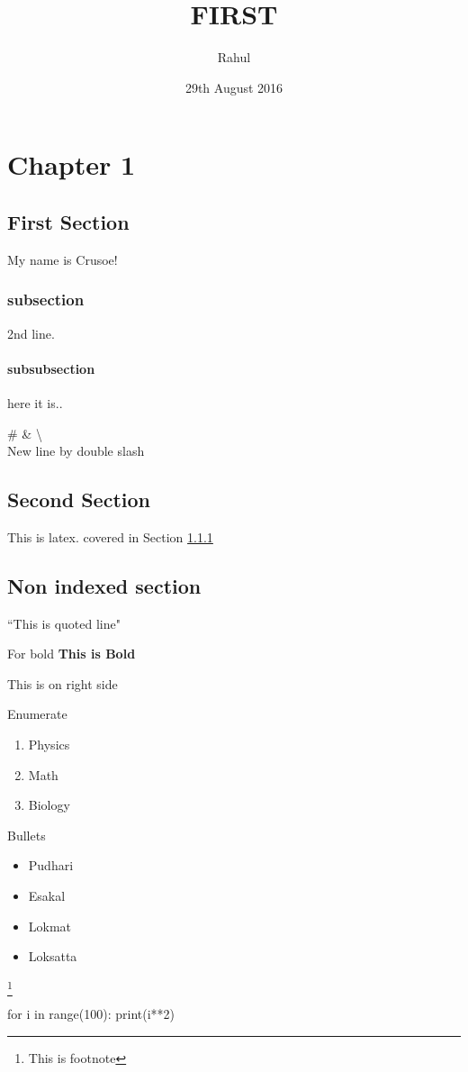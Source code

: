 \documentclass[12pt,a4paper,draft]{report}
\title{FIRST}
\author{Rahul}
\date{29th August 2016}
\begin{document}
\maketitle
\chapter{Chapter 1}
\section{First Section}

My name is Crusoe! %
\subsection{subsection} \label{our:name:sec1}
2nd line.
\subsubsection{subsubsection}
here it is..

\#	%
\& \textbackslash
\\	New line by double slash
\section{Second Section}
This is latex.
covered in Section \ref{our:name:sec1}

\section*{Non indexed section}
``This is quoted line"

For bold \textbf{This is Bold}


\begin{flushright}
This is on right side
\end{flushright}


Enumerate
\begin{enumerate}
    \item Physics
    \item Math
    \item Biology
\end{enumerate}

Bullets
\begin{itemize}
    \item Pudhari
    \item Esakal
    \item Lokmat
    \item Loksatta
\end{itemize}


\footnote{This is footnote}


for i in range(100):
    print(i**2)
\end{document}
